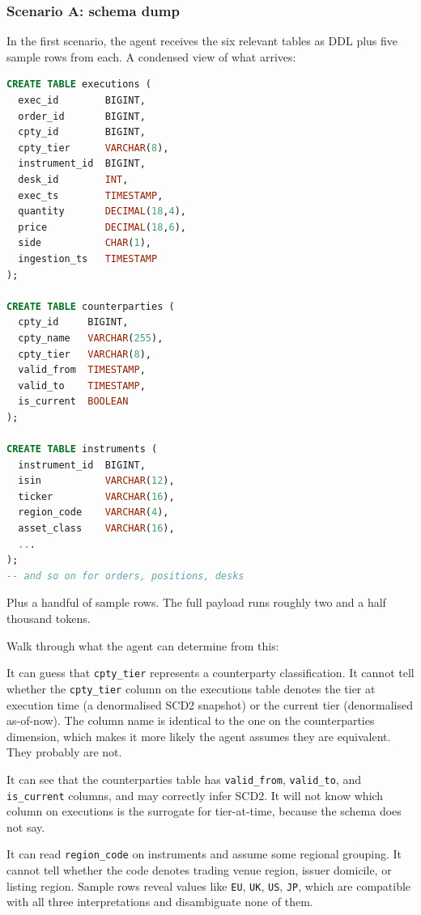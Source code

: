 \documentclass[11pt,a4paper]{article}
\begin{document}
\subsubsection{Scenario A: schema dump}

In the first scenario, the agent receives the six relevant tables as DDL plus five sample rows from each. A condensed view of what arrives:

\begin{lstlisting}[language=sql]
CREATE TABLE executions (
  exec_id        BIGINT,
  order_id       BIGINT,
  cpty_id        BIGINT,
  cpty_tier      VARCHAR(8),
  instrument_id  BIGINT,
  desk_id        INT,
  exec_ts        TIMESTAMP,
  quantity       DECIMAL(18,4),
  price          DECIMAL(18,6),
  side           CHAR(1),
  ingestion_ts   TIMESTAMP
);

CREATE TABLE counterparties (
  cpty_id     BIGINT,
  cpty_name   VARCHAR(255),
  cpty_tier   VARCHAR(8),
  valid_from  TIMESTAMP,
  valid_to    TIMESTAMP,
  is_current  BOOLEAN
);

CREATE TABLE instruments (
  instrument_id  BIGINT,
  isin           VARCHAR(12),
  ticker         VARCHAR(16),
  region_code    VARCHAR(4),
  asset_class    VARCHAR(16),
  ...
);
-- and so on for orders, positions, desks
\end{lstlisting}

Plus a handful of sample rows. The full payload runs roughly two and a half thousand tokens.

Walk through what the agent can determine from this:

It can guess that \texttt{cpty\_tier} represents a counterparty classification. It cannot tell whether the \texttt{cpty\_tier} column on the executions table denotes the tier at execution time (a denormalised SCD2 snapshot) or the current tier (denormalised as-of-now). The column name is identical to the one on the counterparties dimension, which makes it more likely the agent assumes they are equivalent. They probably are not.

It can see that the counterparties table has \texttt{valid\_from}, \texttt{valid\_to}, and \texttt{is\_current} columns, and may correctly infer SCD2. It will not know which column on executions is the surrogate for tier-at-time, because the schema does not say.

It can read \texttt{region\_code} on instruments and assume some regional grouping. It cannot tell whether the code denotes trading venue region, issuer domicile, or listing region. Sample rows reveal values like \texttt{EU}, \texttt{UK}, \texttt{US}, \texttt{JP}, which are compatible with all three interpretations and disambiguate none of them.
\end{document}
